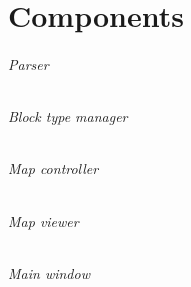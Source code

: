 \newpage
\thispagestyle{empty}

\chapter{Components}
\subparagraph*{Parser}
\subparagraph*{Block type manager}
\subparagraph*{Map controller}
\subparagraph*{Map viewer}
\subparagraph*{Main window}